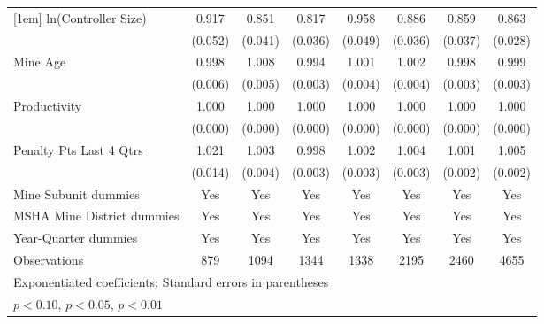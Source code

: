 {\begin{tabular}{l*{7}{c}}
[1em]
ln(Controller Size)      &       0.917         &       0.851\sym{***}&       0.817\sym{***}&       0.958         &       0.886\sym{***}&       0.859\sym{***}&       0.863\sym{***}\\
                         &     (0.052)         &     (0.041)         &     (0.036)         &     (0.049)         &     (0.036)         &     (0.037)         &     (0.028)         \\
[1em]
Mine Age                 &       0.998         &       1.008         &       0.994\sym{*}  &       1.001         &       1.002         &       0.998         &       0.999         \\
                         &     (0.006)         &     (0.005)         &     (0.003)         &     (0.004)         &     (0.004)         &     (0.003)         &     (0.003)         \\
[1em]
Productivity             &       1.000\sym{*}  &       1.000         &       1.000\sym{*}  &       1.000         &       1.000         &       1.000\sym{*}  &       1.000         \\
                         &     (0.000)         &     (0.000)         &     (0.000)         &     (0.000)         &     (0.000)         &     (0.000)         &     (0.000)         \\
[1em]
Penalty Pts Last 4 Qtrs  &       1.021         &       1.003         &       0.998         &       1.002         &       1.004         &       1.001         &       1.005\sym{**} \\
                         &     (0.014)         &     (0.004)         &     (0.003)         &     (0.003)         &     (0.003)         &     (0.002)         &     (0.002)         \\
[1em]
Mine Subunit dummies     &         Yes         &         Yes         &         Yes         &         Yes         &         Yes         &         Yes         &         Yes         \\
[1em]
MSHA Mine District dummies&         Yes         &         Yes         &         Yes         &         Yes         &         Yes         &         Yes         &         Yes         \\
[1em]
Year-Quarter dummies     &         Yes         &         Yes         &         Yes         &         Yes         &         Yes         &         Yes         &         Yes         \\
\hline
Observations             &         879         &        1094         &        1344         &        1338         &        2195         &        2460         &        4655         \\
\hline\hline
\multicolumn{8}{l}{\footnotesize Exponentiated coefficients; Standard errors in parentheses}\\
\multicolumn{8}{l}{\footnotesize \sym{*} \(p<0.10\), \sym{**} \(p<0.05\), \sym{***} \(p<0.01\)}\\
\end{tabular}
}
